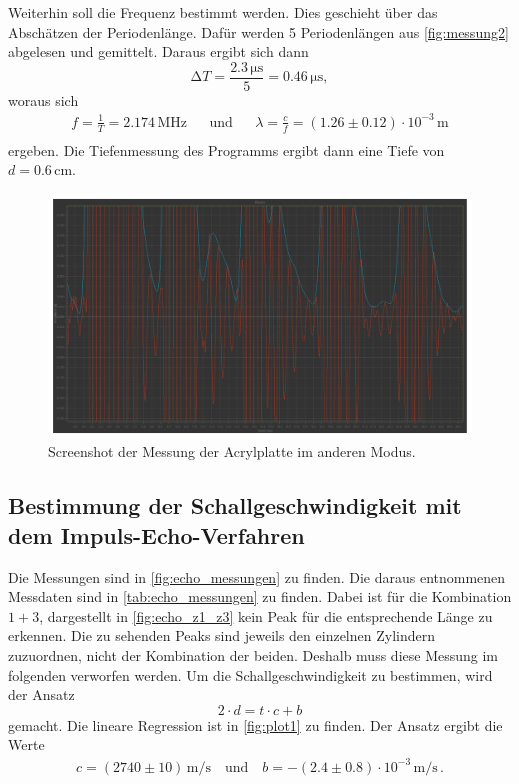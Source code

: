 Weiterhin soll die Frequenz bestimmt werden.
Dies geschieht über das Abschätzen der Periodenlänge.
Dafür werden 5 Periodenlängen aus \autoref{fig:messung2} abgelesen und gemittelt.
Daraus ergibt sich dann
\begin{equation*}
  \increment T = \frac{2.3 \, \unit{\micro\second}}{5} = 0.46 \, \unit{\micro\second},
\end{equation*}
woraus sich
\begin{align*}
  f = \frac{1}{T} = 2.174 \, \unit{\mega\hertz} && \text{und} && \lambda = \frac{c}{f} = (1.26 \pm 0.12) \cdot 10^{-3} \, \unit\meter\\
\end{align*}
ergeben.
Die Tiefenmessung des Programms ergibt dann eine Tiefe von $d = 0.6 \, \unit{\centi\meter}$.


\begin{figure} [H]
  \centering
  \includegraphics[width =\linewidth]{pictures/Schallgeschwindigkeit/Messung2.pdf}
  \caption{Screenshot der Messung der Acrylplatte im anderen Modus.}
  \label{fig:messung2}
\end{figure}


\subsection{Bestimmung der Schallgeschwindigkeit mit dem Impuls-Echo-Verfahren}

Die Messungen sind in \autoref{fig:echo_messungen} zu finden.
Die daraus entnommenen Messdaten sind in \autoref{tab:echo_messungen} zu finden.
Dabei ist für die Kombination $1 + 3$, dargestellt in \autoref{fig:echo_z1_z3} kein Peak für die entsprechende Länge zu erkennen.
Die zu sehenden Peaks sind jeweils den einzelnen Zylindern zuzuordnen, nicht der Kombination der beiden.
Deshalb muss diese Messung im folgenden verworfen werden.
Um die Schallgeschwindigkeit zu bestimmen, wird der Ansatz
\begin{equation*}
  2 \cdot d = t \cdot c + b
\end{equation*}
gemacht. Die lineare Regression ist in \autoref{fig:plot1} zu finden.
Der Ansatz ergibt die Werte
\begin{align*}
  c = (2740 \pm 10)  \, \unit{\meter / \second} \quad \text{und} \quad
  b = -(2.4 \pm 0.8) \cdot 10^{-3} \, \unit{\meter / \second} \, .
\end{align*}

